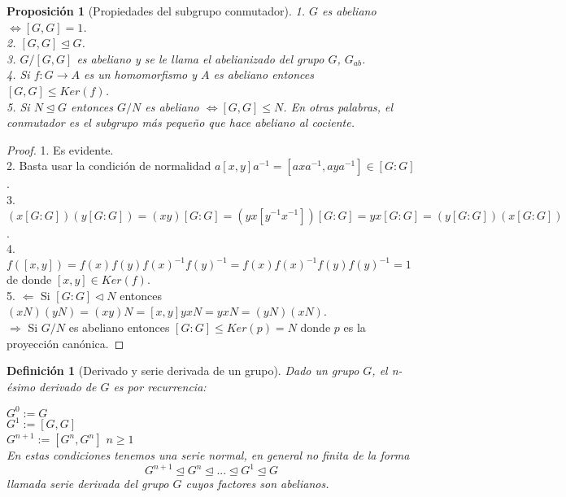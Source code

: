 \documentclass{article}
\theoremstyle{theorem-style}  %
\newtheorem{proposition}[theorem]{Proposición}
\theoremstyle{definition-style}
\newtheorem{definition}{Definición}[section]
\theoremstyle{example-style}
\begin{document}
\begin{proposition}[Propiedades del subgrupo conmutador]
1. $G$ es abeliano $\iff [G,G] = 1$.\\
2. $[G,G] \trianglelefteq G$.\\
3. $G/[G,G]$ es abeliano y se le llama el abelianizado del grupo $G$, $G_{ab}$.\\
4. Si $f:G \rightarrow A$ es un homomorfismo y $A$ es abeliano entonces $[G,G] \le Ker(f)$.\\
5. Si $N \trianglelefteq G$ entonces $G/N$ es abeliano $\iff [G,G] \le N$. En otras palabras, el conmutador es el subgrupo más pequeño que hace abeliano al cociente.
\end{proposition}
\begin{proof}
1. Es evidente.\\
2. Basta usar la condición de normalidad $a[x,y]a^{-1} = [axa^{-1},aya^{-1}] \in [G:G]$.\\
3. $(x[G:G])(y[G:G]) = (xy)[G:G] = (yx[y^{-1}x^{-1}])[G:G] = yx[G:G] = (y[G:G])(x[G:G])$.\\
4. $f([x,y]) = f(x)f(y)f(x)^{-1}f(y)^{-1} = f(x)f(x)^{-1}f(y)f(y)^{-1} = 1$ de donde $[x,y] \in Ker(f)$.\\
5. $\Leftarrow$ Si $[G:G] \triangleleft N$ entonces $(xN)(yN)=(xy)N=[x,y]yxN=yxN = (yN)(xN)$.\\
$\Rightarrow$ Si $G/N$ es abeliano entonces $[G:G] \le Ker(p) = N$ donde $p$ es la proyección canónica.
\end{proof}

\begin{definition}[Derivado y serie derivada de un grupo]
Dado un grupo $G$, el n-ésimo derivado de $G$ es por recurrencia:

$G^{0}:= G$\\
$G^{1}:= [G,G]$\\
$G^{n+1}:=[G^{n},G^{n}]$ $n \ge 1$\\

En estas condiciones tenemos una serie normal, en general no finita de la forma $$G^{n+1} \trianglelefteq G^{n} \trianglelefteq ... \trianglelefteq G^{1} \trianglelefteq G$$ llamada serie derivada del grupo $G$ cuyos factores son abelianos.
\end{definition}
\end{document}
